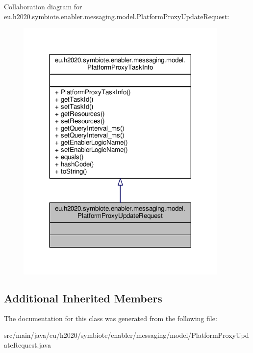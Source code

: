 Collaboration diagram for eu.\+h2020.\+symbiote.\+enabler.\+messaging.\+model.\+Platform\+Proxy\+Update\+Request\+:
\nopagebreak
\begin{figure}[H]
\begin{center}
\leavevmode
\includegraphics[width=296pt]{classeu_1_1h2020_1_1symbiote_1_1enabler_1_1messaging_1_1model_1_1PlatformProxyUpdateRequest__coll__graph}
\end{center}
\end{figure}
\subsection*{Additional Inherited Members}


The documentation for this class was generated from the following file\+:\begin{DoxyCompactItemize}
\item 
src/main/java/eu/h2020/symbiote/enabler/messaging/model/Platform\+Proxy\+Update\+Request.\+java\end{DoxyCompactItemize}
